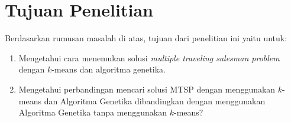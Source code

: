 \section{Tujuan Penelitian}

Berdasarkan rumusan masalah di atas, tujuan dari penelitian ini yaitu untuk:
\begin{enumerate}
	\item Mengetahui cara menemukan solusi \textit{multiple traveling salesman problem} dengan $k$-means dan algoritma genetika.
	\item Mengetahui perbandingan mencari solusi MTSP dengan menggunakan $k$-means dan Algoritma Genetika dibandingkan dengan menggunakan Algoritma Genetika tanpa menggunakan $k$-means?
\end{enumerate}
